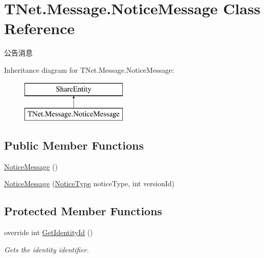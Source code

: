 \hypertarget{class_t_net_1_1_message_1_1_notice_message}{}\section{T\+Net.\+Message.\+Notice\+Message Class Reference}
\label{class_t_net_1_1_message_1_1_notice_message}


公告消息  


Inheritance diagram for T\+Net.\+Message.\+Notice\+Message\+:\begin{figure}[H]
\begin{center}
\leavevmode
\includegraphics[height=2.000000cm]{class_t_net_1_1_message_1_1_notice_message}
\end{center}
\end{figure}
\subsection*{Public Member Functions}
\begin{DoxyCompactItemize}
\item 
\mbox{\hyperlink{class_t_net_1_1_message_1_1_notice_message_ad46cb1714e3437103ef377ee4fb7be1b}{Notice\+Message}} ()
\item 
\mbox{\hyperlink{class_t_net_1_1_message_1_1_notice_message_a814ee2c3201d4fe95e993a2af6a230a3}{Notice\+Message}} (\mbox{\hyperlink{namespace_t_net_1_1_model_a84a982245a4f84ccbdcd9cb3763269b6}{Notice\+Type}} notice\+Type, int version\+Id)
\end{DoxyCompactItemize}
\subsection*{Protected Member Functions}
\begin{DoxyCompactItemize}
\item 
override int \mbox{\hyperlink{class_t_net_1_1_message_1_1_notice_message_a13a45100622573add4a059f735c4eb32}{Get\+Identity\+Id}} ()
\begin{DoxyCompactList}\small\item\em Gets the identity identifier. \end{DoxyCompactList}\end{DoxyCompactItemize}
